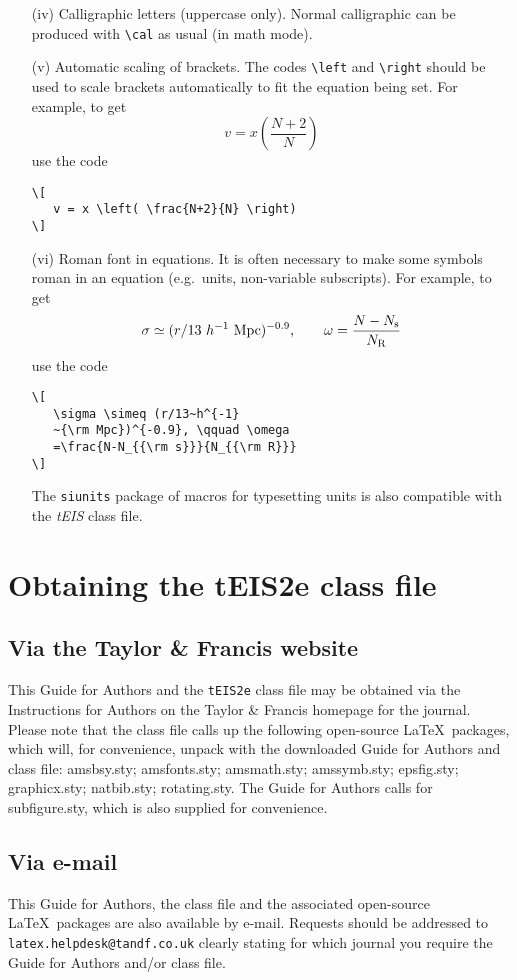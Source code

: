 \documentclass[]{tEIS2e}
\theoremstyle{plain}
\theoremstyle{remark}
\begin{document}
\begin{enumerate}
\item[(iv)] Calligraphic letters (uppercase only).
%
%
Normal calligraphic can be produced with \verb"\cal" as usual (in
math mode).

\item[(v)] Automatic scaling of brackets. The codes \verb"\left" and
\verb"\right" should  be used to scale brackets automatically to
fit the equation being set. For example, to get
\[
   v = x \left( \frac{N+2}{N} \right)
\]
use the code
%
\begin{verbatim}
\[
   v = x \left( \frac{N+2}{N} \right)
\]
\end{verbatim}

\item[(vi)] Roman font in equations. It is often necessary to make some
symbols roman in an equation (e.g.\ units, non-variable
subscripts). For example, to get
\[
   \sigma \simeq (r/13~h^{-1}~{\rm Mpc})^{-0.9},
   \qquad \omega = \frac{N-N_{\rm s}}{N_{\rm R}}
\]
\noindent use the code
%
\begin{verbatim}
\[
   \sigma \simeq (r/13~h^{-1}
   ~{\rm Mpc})^{-0.9}, \qquad \omega
   =\frac{N-N_{{\rm s}}}{N_{{\rm R}}}
\]
\end{verbatim}
The {\tt siunits} package of macros for typesetting units is also compatible with the {\it tEIS} class file.
\end{enumerate}


\section{Obtaining the tEIS2e class file}\label{FTP}

\subsection{Via the Taylor \& Francis website}

\noindent This Guide for Authors and the \verb"tEIS2e" class file may be obtained via the Instructions for Authors
on the Taylor \& Francis homepage for the journal.
Please note that the class file calls up the following open-source \LaTeX\ packages, which will, for convenience,
unpack with the downloaded Guide for Authors and class file: amsbsy.sty; amsfonts.sty; amsmath.sty; amssymb.sty; epsfig.sty; graphicx.sty; natbib.sty; rotating.sty. The Guide for Authors calls for subfigure.sty, which is also supplied for convenience.


\subsection{Via e-mail}

This Guide for Authors, the class file and the associated open-source \LaTeX\ packages are also available by
e-mail. Requests should be addressed to {\tt latex.helpdesk@tandf.co.uk} clearly stating for which journal you
require the Guide for Authors and/or class file.

\cite{salfnerSurvey}


 

\label{lastpage}
\end{document}
